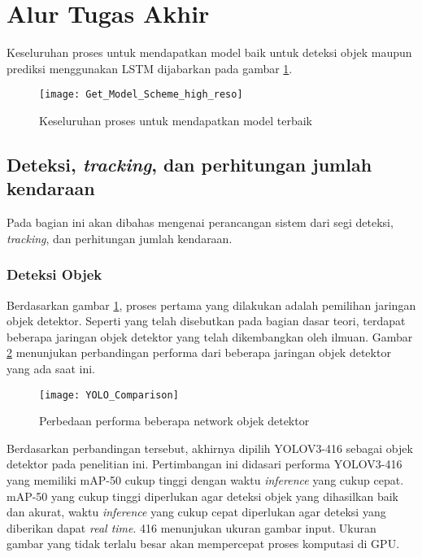 \documentclass[../thesis.tex]{subfiles}
\begin{document}
\section{Alur Tugas Akhir}
Keseluruhan proses untuk mendapatkan model baik untuk deteksi objek maupun prediksi menggunakan LSTM dijabarkan pada gambar \ref{get_model_scheme}.
\begin{figure}[htp]
	\centering
	\texttt{[image: Get\_Model\_Scheme\_high\_reso]}
	\caption{Keseluruhan proses untuk mendapatkan model terbaik}
	\label{get_model_scheme}
\end{figure}

\subsection{Deteksi, \textit{tracking}, dan perhitungan jumlah kendaraan}
Pada bagian ini akan dibahas mengenai perancangan sistem dari segi deteksi, \textit{tracking}, dan perhitungan jumlah kendaraan.
\subsubsection{Deteksi Objek}
Berdasarkan gambar \ref{get_model_scheme}, proses pertama yang dilakukan adalah pemilihan jaringan objek detektor. Seperti yang telah disebutkan pada bagian dasar teori, terdapat beberapa jaringan objek detektor yang telah dikembangkan oleh ilmuan. 
Gambar \ref{yolo_comparison} menunjukan perbandingan performa dari beberapa jaringan objek detektor yang ada saat ini.
\begin{figure}
	\centering
	\texttt{[image: YOLO\_Comparison]}
	\caption{Perbedaan performa beberapa network objek detektor}
	\label{yolo_comparison}
\end{figure}

Berdasarkan perbandingan tersebut, akhirnya dipilih YOLOV3-416 sebagai objek detektor pada penelitian ini. Pertimbangan ini didasari performa YOLOV3-416 yang memiliki mAP-50 cukup tinggi dengan waktu \textit{inference} yang cukup cepat. 
mAP-50 yang cukup tinggi diperlukan agar deteksi objek yang dihasilkan baik dan akurat, waktu \textit{inference} yang cukup cepat diperlukan agar deteksi yang diberikan dapat \textit{real time}. 416 menunjukan ukuran gambar input. Ukuran gambar yang tidak terlalu besar akan mempercepat proses komputasi di GPU.
\end{document}
